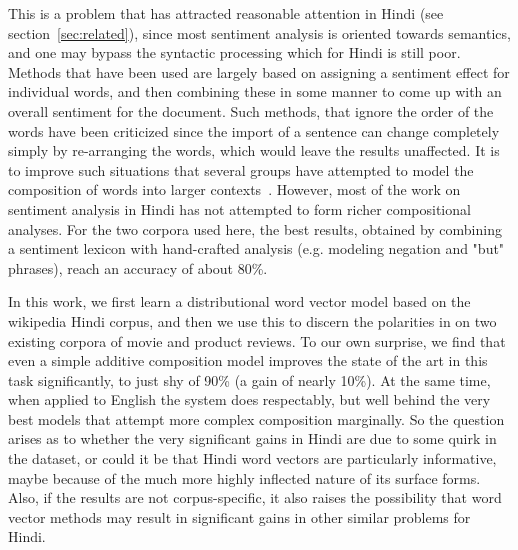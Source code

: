 \def\DevnagVersion{2.15}\documentclass[11pt]{article}
\begin{document}
This is a problem that has attracted reasonable attention in Hindi (see section~\ref{sec:related}), since most sentiment
analysis is oriented towards semantics, and one may bypass the syntactic
processing which for Hindi is still poor.   Methods that have been used
are largely based on assigning a sentiment effect for individual words, and
then combining these in some manner to come up with an overall sentiment for
the document.  Such methods, that ignore the order of the words have been
criticized since the import of a sentence can change completely simply by
re-arranging the words, which would leave the results unaffected.
It is to improve such situations that several groups have attempted to model
the composition of words into larger contexts~\cite{Mikolov:13c,Socher:13,Johnson:14}.
However, most of the work on sentiment analysis in Hindi has not attempted to
form richer compositional analyses.   For the two corpora used here, the 
best results, obtained by combining a sentiment lexicon with hand-crafted analysis (e.g. modeling negation and "but" phrases), reach an accuracy of about 80\%.  

In this work, we first learn a distributional word vector model
based on the wikipedia Hindi corpus, and then we use this to discern
the polarities in on two existing corpora of movie and product reviews.
To our own surprise, we find that even a simple additive composition model
improves the state of the art in this task significantly, to just
shy of 90\% (a gain of nearly 10\%).
At the same time, when applied to English
the system does respectably, but well behind the very best
models that attempt more complex composition marginally. 
So the question arises as to whether the very significant gains in
Hindi are due to some quirk in the 
dataset, or could it be that Hindi word vectors are particularly informative,
maybe because of the much more highly inflected nature of its
surface forms.  Also, if the results are not corpus-specific, it also raises
the possibility that word vector methods may result in significant gains in
other similar problems for Hindi. 
 
\end{document}
